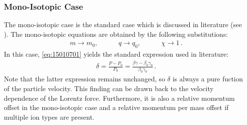 
\subsubsection{Mono-Isotopic Case}
The mono-isotopic case is the standard case which is discussed in literature (see \cite{Proceedings1994zua,wiedemann1999particle,lee2012accelerator}). The mono-isotopic equations are obtained by the following substitutions:
\begin{align}
m \rightarrow m_0, \quad \quad \quad q \rightarrow q_0, \quad \quad \quad  \chi \rightarrow 1\, .
\end{align}
In this case, \eqref{eq:15010701} yields the standard expression used in literature:
\begin{align}
\delta = \frac{P - P_0}{P_0} = \frac{\beta \gamma - \beta_0 \gamma_0}{\beta_0 \gamma_0} \, .
\end{align}
Note that the latter expression remains unchanged, so $\delta$ is always a pure fuction of the particle velocity. This finding can be drawn back to the velocity dependence of the Lorentz force. Furthermore, it is also a relative momentum offset in the mono-isotopic case and a relative momentum per mass offset if multiple ion types are present.


